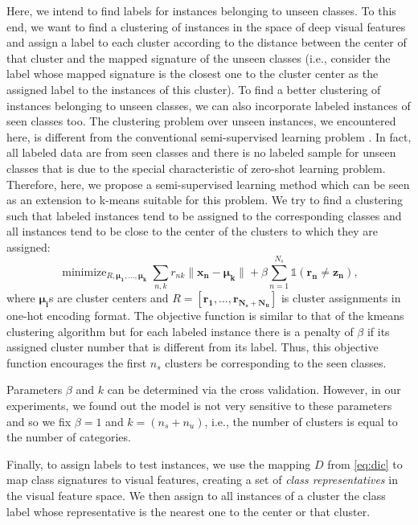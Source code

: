 \documentclass[10pt,twocolumn,letterpaper]{article}
\DeclareMathOperator*{\minimize}{minimize}
\begin{document}
Here, we intend to find labels for instances belonging to unseen classes. To this end, we want to find a clustering of instances in the space of deep visual features and assign a label to each cluster according to the distance between the center of that cluster and the mapped signature of the unseen classes (i.e., consider the label whose mapped signature is the closest one to the cluster center as the assigned label to the instances of this cluster). To find a better clustering of instances belonging to unseen classes, we can also incorporate labeled instances of seen classes too. The clustering problem over unseen instances, we encountered here, is different from the conventional semi-supervised learning problem \cite{}.
In fact, all labeled data are from seen classes and there is no labeled sample for unseen classes that is due to the special characteristic of zero-shot learning problem. Therefore, here, we propose a semi-supervised learning method which
can be seen as an extension to k-means suitable for this problem.
 We try to find a clustering such that labeled instances tend to be assigned to the corresponding classes and all instances tend to be close to the center of the clusters to which they are assigned:
\begin{equation}
\minimize_{R, \mathbf{\mu_1, \ldots, \mu_k }}  \sum_{n,k} r_{nk} \lVert \mathbf{x_n - \mu_k} \rVert +
 \beta \sum_{n=1}^{N_s} \mathds{1}(\mathbf{r_n \neq z_n}),
\end{equation}
where $\mathbf{\mu_i}$s are cluster centers and $R = [\mathbf{r_1, \ldots, r_{N_s + N_u }} ]$ is cluster assignments in one-hot encoding format.
The objective function is similar to that of the kmeans clustering algorithm but for each labeled instance there is a penalty of $\beta$ if its assigned cluster number that is different from its label. Thus, this objective function encourages
the first $n_s$ clusters be corresponding to the seen classes.

Parameters $\beta$ and $k$ can be determined via the cross validation. However, in our experiments, we found out
the model is not very sensitive to these parameters and so we fix $\beta=1$ and $k =  (n_s + n_u)$, i.e., the number of clusters is equal to the number of categories.

Finally, to assign labels to test instances, we use the mapping $D$ from \eqref{eq:dic} to map class signatures to visual features, creating a set of \textit{class representatives} in the visual feature space. We then assign to all instances of a cluster the class label whose representative is the nearest one to the center or that cluster.
\end{document}

